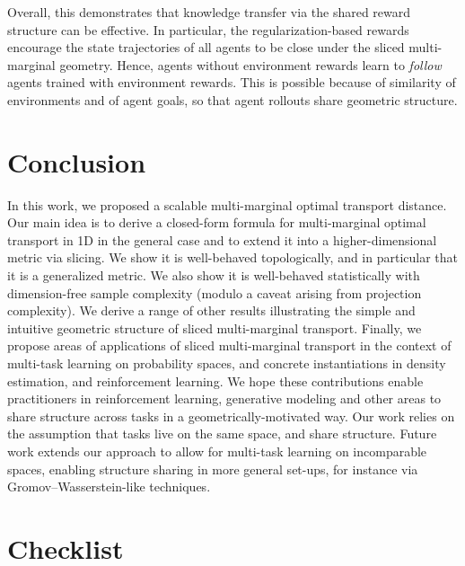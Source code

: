\documentclass{article}
\begin{document}
Overall, this demonstrates that knowledge transfer via the shared reward structure can be effective.
In particular, the regularization-based rewards encourage the state trajectories of all agents to be close under the sliced multi-marginal geometry. Hence, agents without environment rewards learn to \emph{follow} agents trained with environment rewards. This is possible because of similarity of environments and of agent goals, so that agent rollouts  share geometric structure. 







\section{Conclusion}

In this work, we proposed a scalable multi-marginal optimal transport distance. Our main idea is to derive a closed-form formula for multi-marginal optimal transport in 1D in the general case and to extend it into a higher-dimensional metric via slicing. We show it is well-behaved topologically, and in particular that it is a generalized metric. We also show it is well-behaved statistically with dimension-free sample complexity (modulo a caveat arising from projection complexity). We derive a range of other results illustrating the simple and intuitive geometric structure of sliced multi-marginal transport. Finally, we propose areas of applications of sliced multi-marginal transport in the context of multi-task learning on probability spaces, and concrete instantiations in density estimation, and reinforcement learning. We hope these contributions enable practitioners in reinforcement learning, generative modeling and other areas to share structure across tasks in a geometrically-motivated way. Our work relies on the assumption that tasks live on the same space, and share structure. Future work extends our approach to allow for multi-task learning on incomparable spaces, enabling structure sharing in more general set-ups, for instance via Gromov--Wasserstein-like techniques.





\printbibliography

\newpage

\section*{Checklist}

\newpage
\appendix
\end{document}
